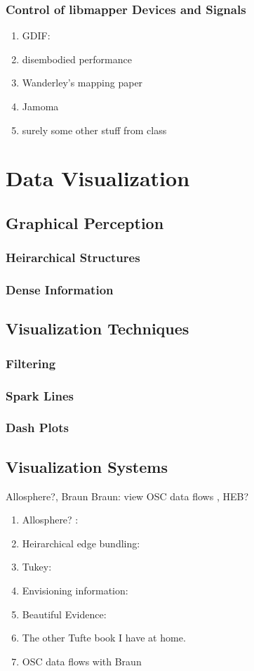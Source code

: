 		\subsubsection{Control of libmapper Devices and Signals}
	\begin{enumerate}
		\item GDIF: 
		\item disembodied performance
		\item Wanderley's mapping paper 
		\item Jamoma 
		\item surely some other stuff from class
	\end{enumerate}

\section{Data Visualization}
	\subsection{Graphical Perception}
		\subsubsection{Heirarchical Structures}
		\subsubsection{Dense Information}
	\subsection{Visualization Techniques}
		\subsubsection{Filtering}
		\subsubsection{Spark Lines}
		\subsubsection{Dash Plots}
	\subsection{Visualization Systems}
		Allosphere?, Braun Braun: view OSC data flows , HEB?
	\begin{enumerate}
		\item Allosphere? :
		\item Heirarchical edge bundling: 
		\item Tukey: 
		\item Envisioning information: 
		\item Beautiful Evidence: 
		\item The other Tufte book I have at home.
		\item OSC data flows with Braun 
	\end{enumerate}

